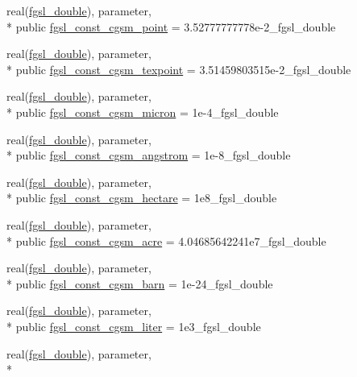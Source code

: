 \begin{DoxyCompactItemize}
real(\hyperlink{classfgsl_a9af5113378e0f000eb479d3f90196ddf}{fgsl\-\_\-double}), parameter, \\*
public \hyperlink{classfgsl_a924bd137c2b9e9abffbc4edb9826b398}{fgsl\-\_\-const\-\_\-cgsm\-\_\-point} = 3.\-52777777778e-\/2\-\_\-fgsl\-\_\-double
\item 
real(\hyperlink{classfgsl_a9af5113378e0f000eb479d3f90196ddf}{fgsl\-\_\-double}), parameter, \\*
public \hyperlink{classfgsl_af0bb6a664a268b6db97ed93021e98828}{fgsl\-\_\-const\-\_\-cgsm\-\_\-texpoint} = 3.\-51459803515e-\/2\-\_\-fgsl\-\_\-double
\item 
real(\hyperlink{classfgsl_a9af5113378e0f000eb479d3f90196ddf}{fgsl\-\_\-double}), parameter, \\*
public \hyperlink{classfgsl_afa1f606b298574904dc1963ed870db4b}{fgsl\-\_\-const\-\_\-cgsm\-\_\-micron} = 1e-\/4\-\_\-fgsl\-\_\-double
\item 
real(\hyperlink{classfgsl_a9af5113378e0f000eb479d3f90196ddf}{fgsl\-\_\-double}), parameter, \\*
public \hyperlink{classfgsl_aedfe01763a71e3f82c2dee8a2586b442}{fgsl\-\_\-const\-\_\-cgsm\-\_\-angstrom} = 1e-\/8\-\_\-fgsl\-\_\-double
\item 
real(\hyperlink{classfgsl_a9af5113378e0f000eb479d3f90196ddf}{fgsl\-\_\-double}), parameter, \\*
public \hyperlink{classfgsl_a4d19d597ffc77fc0c1aa577276cab117}{fgsl\-\_\-const\-\_\-cgsm\-\_\-hectare} = 1e8\-\_\-fgsl\-\_\-double
\item 
real(\hyperlink{classfgsl_a9af5113378e0f000eb479d3f90196ddf}{fgsl\-\_\-double}), parameter, \\*
public \hyperlink{classfgsl_a6417ace541dc0310036197a333495c36}{fgsl\-\_\-const\-\_\-cgsm\-\_\-acre} = 4.\-04685642241e7\-\_\-fgsl\-\_\-double
\item 
real(\hyperlink{classfgsl_a9af5113378e0f000eb479d3f90196ddf}{fgsl\-\_\-double}), parameter, \\*
public \hyperlink{classfgsl_a96f3fd765f8469355c932e287e34f25a}{fgsl\-\_\-const\-\_\-cgsm\-\_\-barn} = 1e-\/24\-\_\-fgsl\-\_\-double
\item 
real(\hyperlink{classfgsl_a9af5113378e0f000eb479d3f90196ddf}{fgsl\-\_\-double}), parameter, \\*
public \hyperlink{classfgsl_aa765c28c4966a92d631fc0d4721e7160}{fgsl\-\_\-const\-\_\-cgsm\-\_\-liter} = 1e3\-\_\-fgsl\-\_\-double
\item 
real(\hyperlink{classfgsl_a9af5113378e0f000eb479d3f90196ddf}{fgsl\-\_\-double}), parameter, \\*

\end{DoxyCompactItemize}
